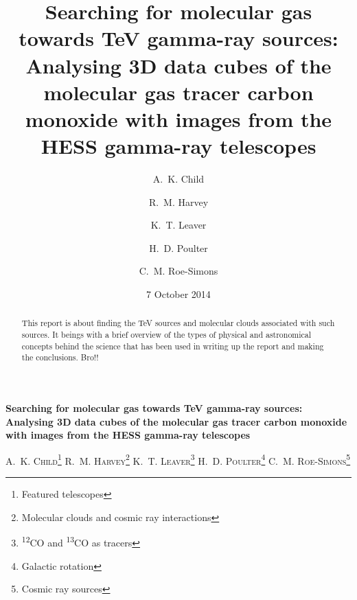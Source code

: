 \documentclass[a4paper, titlepage, oneside]{article}
\newcommand{\elem}[2]{\textsuperscript{#1}{#2}}
\begin{document}
\title{\textbf{Searching for molecular gas towards TeV gamma-ray sources: Analysing 3D data cubes of the molecular gas tracer carbon monoxide with images from the HESS gamma-ray telescopes}}
\author{A.~K. Child \and R.~M. Harvey \and K.~T. Leaver \and H.~D. Poulter \and C.~M. Roe-Simons}
\date{7 October 2014} %
\maketitle

\setcounter{page}{1}

\tableofcontents

\clearpage
\setcounter{page}{1}

\begin{center}
  {\large \textbf{Searching for molecular gas towards TeV gamma-ray sources: Analysing 3D data cubes of the molecular gas tracer carbon monoxide with images from the HESS gamma-ray telescopes}}

  \vspace{1.5em}

  \textsc{A.~K. Child\footnote{Featured telescopes} \quad R.~M. Harvey\footnote{Molecular clouds and cosmic ray interactions} \quad K.~T. Leaver\footnote{\elem{12}{CO} and \elem{13}{CO} as tracers} \quad H.~D. Poulter\footnote{Galactic rotation} \quad C.~M. Roe-Simons\footnote{Cosmic ray sources}}
\end{center}

\vspace{2em}

\begin{minipage}{0.93\textwidth}
  \begin{abstract}
  This report is about finding the TeV sources and molecular clouds associated with such sources. It beings with a brief overview of the types of physical and astronomical concepts behind the science that has been used in writing up the report and making the conclusions. Bro!!
  \end{abstract}
\end{minipage}

\vspace{2.5em}
\end{document}
